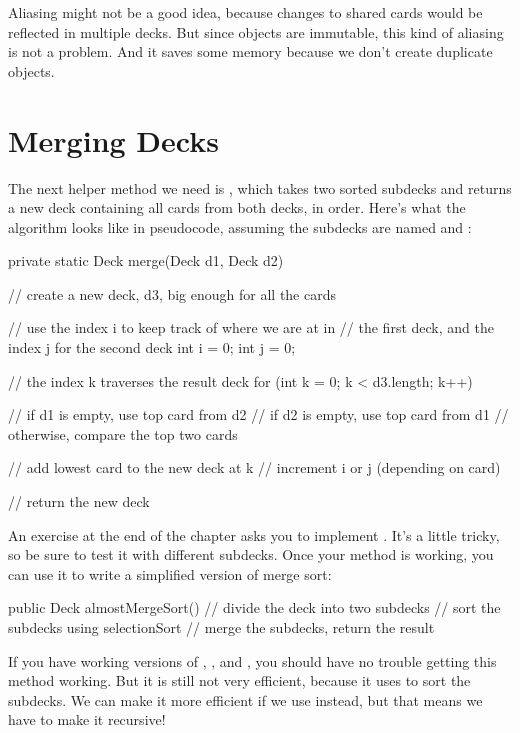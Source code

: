
Aliasing might not be a good idea, because changes to shared cards would be reflected in multiple decks.
But since  objects are immutable, this kind of aliasing is not a problem.
And it saves some memory because we don't create duplicate  objects.


\section{Merging Decks}


The next helper method we need is , which takes two sorted subdecks and returns a new deck containing all cards from both decks, in order.
Here's what the algorithm looks like in pseudocode, assuming the subdecks are named  and :

\begin{code}
private static Deck merge(Deck d1, Deck d2) {
    // create a new deck, d3, big enough for all the cards

    // use the index i to keep track of where we are at in
    // the first deck, and the index j for the second deck
    int i = 0;
    int j = 0;

    // the index k traverses the result deck
    for (int k = 0; k < d3.length; k++) {
        // if d1 is empty, use top card from d2
        // if d2 is empty, use top card from d1
        // otherwise, compare the top two cards

        // add lowest card to the new deck at k
        // increment i or j (depending on card)
    }
    // return the new deck
}
\end{code}

An exercise at the end of the chapter asks you to implement .
It's a little tricky, so be sure to test it with different subdecks.
Once your  method is working, you can use it to write a simplified version of merge sort:

\begin{code}
public Deck almostMergeSort() {
    // divide the deck into two subdecks
    // sort the subdecks using selectionSort
    // merge the subdecks, return the result
}
\end{code}

If you have working versions of , , and , you should have no trouble getting this method working.
But it is still not very efficient, because it uses  to sort the subdecks.
We can make it more efficient if we use  instead, but that means we have to make it recursive!


